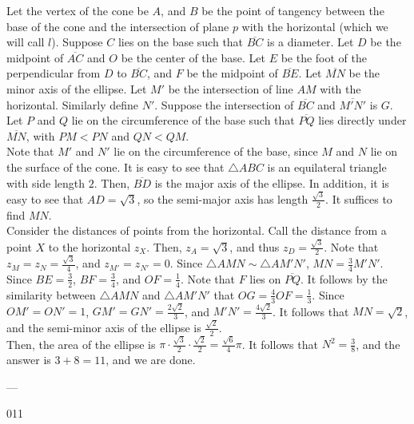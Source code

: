 Let the vertex of the cone be $A$, and $B$ be the point of tangency between the base of the cone and the intersection of plane $p$ with the horizontal (which we will call $l$). Suppose $C$ lies on the base such that $\overline{BC}$ is a diameter. Let $D$ be the midpoint of $\overline{AC}$ and $O$ be the center of the base. Let $E$ be the foot of the perpendicular from $D$ to $\overline{BC}$, and $F$ be the midpoint of $\overline{BE}$. Let $\overline{MN}$ be the minor axis of the ellipse. Let $M'$ be the intersection of line $AM$ with the horizontal. Similarly define $N'$. Suppose the intersection of $\overline{BC}$ and $\overline{M'N'}$ is $G$. Let $P$ and $Q$ lie on the circumference of the base such that $\overline{PQ}$ lies directly under $\overline{MN}$, with $PM<PN$ and $QN<QM$. \\

Note that $M'$ and $N'$ lie on the circumference of the base, since $M$ and $N$ lie on the surface of the cone. It is easy to see that $\triangle ABC$ is an equilateral triangle with side length $2$. Then, $\overline{BD}$ is the major axis of the ellipse. In addition, it is easy to see that $AD=\sqrt{3}$, so the semi-major axis has length $\frac{\sqrt{3}}{2}$. It suffices to find $MN$. \\

Consider the distances of points from the horizontal. Call the distance from a point $X$ to the horizontal $z_X$. Then, $z_A=\sqrt{3}$, and thus $z_D=\frac{\sqrt{3}}{2}$. Note that $z_M=z_N=\frac{\sqrt{3}}{4}$, and $z_{M'}=z_{N'}=0$. Since $\triangle AMN\sim\triangle AM'N'$, $MN=\frac{3}{4}M'N'$. \\

Since $BE=\frac{3}{2}$, $BF=\frac{3}{4}$, and $OF=\frac{1}{4}$. Note that $F$ lies on $\overline{PQ}$. It follows by the similarity between $\triangle AMN$ and $\triangle AM'N'$ that $OG=\frac{4}{3}OF=\frac{1}{3}$. Since $OM'=ON'=1$, $GM'=GN'=\frac{2\sqrt{2}}{3}$, and $M'N'=\frac{4\sqrt{2}}{3}$. It follows that $MN=\sqrt{2}$, and the semi-minor axis of the ellipse is $\frac{\sqrt{2}}{2}$. \\

Then, the area of the ellipse is $\pi\cdot\frac{\sqrt{3}}{2}\cdot\frac{\sqrt{2}}{2}=\frac{\sqrt{6}}{4}\pi$. It follows that $N^2=\frac{3}{8}$, and the answer is $3+8=11$, and we are done.

---

011
